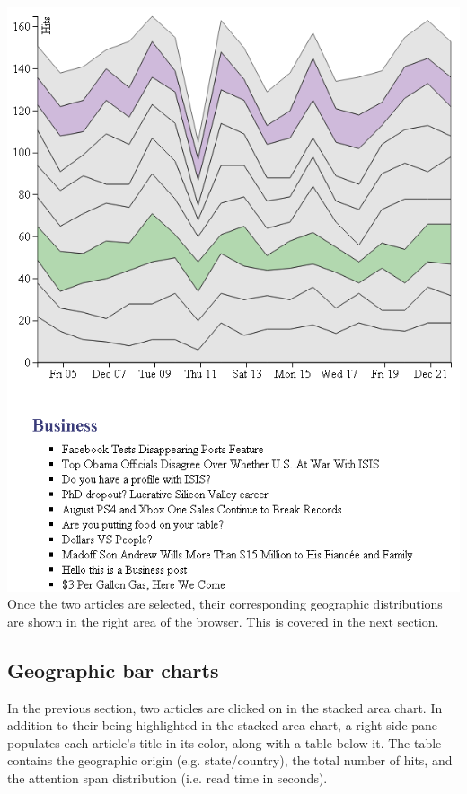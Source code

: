 \documentclass[12pt]{article}
\begin{document}
\noindent\includegraphics[scale=0.8]{img/viz_7} \\

\noindent Once the two articles are selected, their corresponding geographic distributions are shown in the right area of the browser. This is covered in the next section. 

\subsection{Geographic bar charts}

In the previous section, two articles are clicked on in the stacked area chart. In addition to their being highlighted in the stacked area chart, a right side pane populates each article's title in its color, along with a table below it. The table contains the geographic origin (e.g. state/country), the total number of hits, and the attention span distribution (i.e. read time in seconds).
\end{document}
